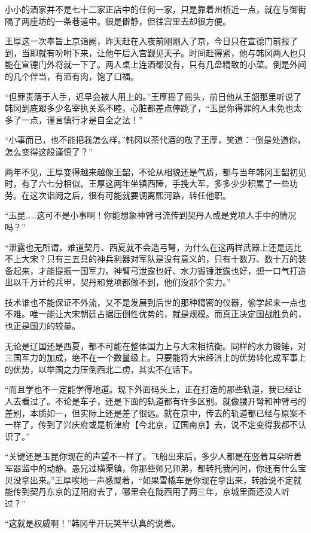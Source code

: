 小小的酒家并不是七十二家正店中的任何一家，只是靠着州桥近一点，就在与御街隔了两座坊的一条巷道中。很是僻静，但往宫里去却很方便。

王厚这一次奉旨上京诣阙，昨天赶在入夜前刚刚入了京，今日只在宣德门前报了到，当即就有吩咐下来，让他午后入宫觐见天子。时间赶得紧，他与韩冈两人也只能在宣德门外将就一下了。两人桌上连酒都没有，只有几盘精致的小菜。倒是外间的几个伴当，有酒有肉，饱了口福。

“但罪责落于人手，迟早会被人用上的。”王厚摇了摇头，前日他从王韶那里听说了韩冈到底跟多少名宰执关系不睦，心脏都差点停跳了，“玉昆你得罪的人未免也太多了一点，谨言慎行才是自全之法！”

“小事而已，也不能把我怎么样。”韩冈以茶代酒的敬了王厚，笑道：“倒是处道你，怎么变得这般谨慎了？”

两年不见，王厚变得越来越像王韶，不论从相貌还是气质，都与当年韩冈王韶初见时，有了六七分相似。王厚这两年坐镇西陲，手挽大军，多多少少积累了一些功劳。在这次诣阙之后，很有可能就要调离熙河路，转任他职。

“玉昆……这可不是小事啊！你能想象神臂弓流传到契丹人或是党项人手中的情况吗？”

“泄露也无所谓，难道契丹、西夏就不会造弓弩，为什么在这两样武器上还是远比不上大宋？只有三五具的神兵利器对军队是没有意义的，只有十数万、数十万的装备起来，才能提振一国军力。神臂弓泄露也好、水力锻锤泄露也好，想一口气打造出以千万计的兵甲，契丹和党项都做不到，他们没那个实力。”

技术谁也不能保证不外流，又不是发展到后世的那种精密的仪器，偷学起来一点也不难。唯一能让大宋朝廷占据压倒性优势的，就是规模。而真正决定国战胜负的，也正是国力的较量。

无论是辽国还是西夏，都不可能在整体国力上与大宋相抗衡。同样的水力锻锤，对三国军力的加成，绝不在一个数量级上。只要能将大宋经济上的优势转化成军事上的优势，以举国之力压倒西北二虏，其实不在话下。

“而且学也不一定能学得地道。现下外面码头上，正在打造的那些轨道，我已经让人去看过了。不论是车子，还是下面的轨道都有许多区别。就像腰开弩和神臂弓的差别，本质如一，但实际上还是差了很远。就在京中，传去的轨道都已经与原案不一样了，传到了兴庆府或是析津府【今北京，辽国南京】去，说不定变得我都不认识了。”

“关键还是玉昆你现在的声望不一样了。飞船出来后，多少人都是在竖着耳朵听着军器监中的动静。愚兄过横渠镇，你那些师兄师弟，都转托我问问，你还有什么宝贝没拿出来。”王厚唉地一声感慨着，“如果雪橇车是你现在拿出来，转脸说不定就能传到契丹东京的辽阳府去了，哪里会在陇西用了两三年，京城里面还没人听过？”

“这就是权威啊！”韩冈半开玩笑半认真的说着。

